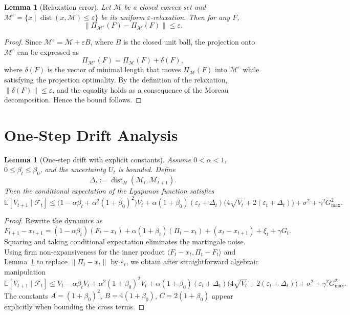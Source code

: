 \documentclass{article}
\newtheorem{lemma}[theorem]{Lemma}
\begin{document}
\begin{lemma}[Relaxation error]\label{lem:relax}
Let $\mathcal{M}$ be a closed convex set and $\mathcal{M}^{\varepsilon} = \{x \mid \operatorname{dist}(x,\mathcal{M}) \le \varepsilon\}$ be its uniform $\varepsilon$‑relaxation. Then for any $F$,
\[
\|\Pi_{\mathcal{M}^{\varepsilon}}(F) - \Pi_{\mathcal{M}}(F)\| \le \varepsilon .
\]
\end{lemma}
\begin{proof}
Since $\mathcal{M}^{\varepsilon} = \mathcal{M} + \varepsilon B$, where $B$ is the closed unit ball, the projection onto $\mathcal{M}^{\varepsilon}$ can be expressed as
\[
\Pi_{\mathcal{M}^{\varepsilon}}(F) = \Pi_{\mathcal{M}}(F) + \delta(F),
\]
where $\delta(F)$ is the vector of minimal length that moves $\Pi_{\mathcal{M}}(F)$ into $\mathcal{M}^{\varepsilon}$ while satisfying the projection optimality. By the definition of the relaxation, $\|\delta(F)\| \le \varepsilon$, and the equality holds as a consequence of the Moreau decomposition. Hence the bound follows.
\end{proof}

\section{One‑Step Drift Analysis}
\label{sec:drift}

\begin{lemma}[One‑step drift with explicit constants]\label{lem:drift}
Assume $0<\alpha<1$, $0\le\beta_t\le\beta_0$, and the uncertainty $U_t$ is bounded. Define
\[
\Delta_t := \operatorname{dist}_H(\mathcal{M}_t,\mathcal{M}_{t+1}) .
\]
Then the conditional expectation of the Lyapunov function satisfies
\[
\mathbb{E}[V_{t+1}\mid\mathcal{F}_t]
\le \bigl(1 - \alpha\beta_t + \alpha^2(1+\beta_0)^2\bigr) V_t
   + \alpha(1+\beta_0)(\varepsilon_t+\Delta_t)\bigl(4\sqrt{V_t} + 2(\varepsilon_t+\Delta_t)\bigr)
   + \sigma^2 + \gamma^2 G_{\max}^2 .
\]
\end{lemma}
\begin{proof}
Rewrite the dynamics as
\[
F_{t+1} - x_{t+1} = (1-\alpha\beta_t)(F_t - x_t) + \alpha(1+\beta_t)(\Pi_t - x_t) + (x_t - x_{t+1}) + \xi_t + \gamma G_t .
\]
Squaring and taking conditional expectation eliminates the martingale noise. Using firm non‑expansiveness for the inner product $\langle F_t - x_t, \Pi_t - F_t\rangle$ and Lemma~\ref{lem:relax} to replace $\|\Pi_t - x_t\|$ by $\varepsilon_t$, we obtain after straightforward algebraic manipulation
\[
\mathbb{E}[V_{t+1}\mid\mathcal{F}_t]
\le V_t - \alpha\beta_t V_t + \alpha^2(1+\beta_0)^2 V_t
   + \alpha(1+\beta_0)(\varepsilon_t+\Delta_t) \bigl(4\sqrt{V_t} + 2(\varepsilon_t+\Delta_t)\bigr)
   + \sigma^2 + \gamma^2 G_{\max}^2 .
\]
The constants $A=(1+\beta_0)^2$, $B=4(1+\beta_0)$, $C=2(1+\beta_0)$ appear explicitly when bounding the cross terms.
\end{proof}
\end{document}
